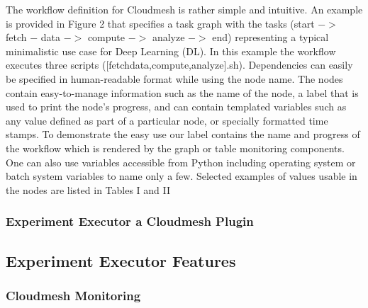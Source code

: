 \documentclass[utf8]{FrontiersinVancouver} %
\begin{document}
The workflow definition for Cloudmesh is rather simple and
intuitive. An example is provided in Figure 2 that specifies a task
graph with the tasks (start $->$ fetch − data $->$ compute $->$ analyze $->$ end)
representing a typical minimalistic use case for Deep Learning
(DL). In this example the workflow executes three scripts
([fetchdata,compute,analyze].sh). Dependencies can easily be specified
in human-readable format while using the node name. The nodes contain
easy-to-manage information such as the name of the node, a label that
is used to print the node’s progress, and can contain templated
variables such as any value defined as part of a particular node, or
specially formatted time stamps.  To demonstrate the easy use our
label contains the name and progress of the workflow which is rendered
by the graph or table monitoring components. One can also use
variables accessible from Python including operating system or batch
system variables to name only a few. Selected examples of values
usable in the nodes are listed in Tables I and II



\subsubsection{Experiment Executor a Cloudmesh Plugin}





\subsection{Experiment Executor Features}


\citep{las-frontiers-edu}





\subsubsection{Cloudmesh Monitoring}
\label{sec:monitoring}
\end{document}
